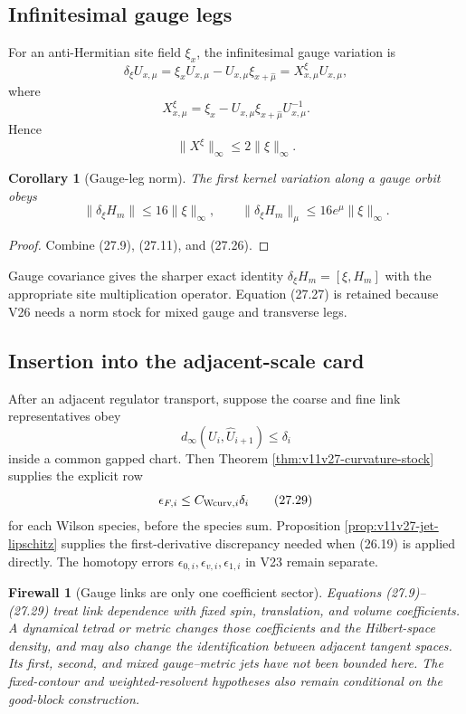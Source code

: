 \documentclass[11pt]{article}
\newtheorem{corollary}[theorem]{Corollary}
\newtheorem{firewall}[theorem]{Firewall}
\begin{document}
\subsection{Infinitesimal gauge legs}

For an anti-Hermitian site field \(\xi_x\), the infinitesimal gauge
variation is
\[
 \delta_\xi U_{x,\mu}
 =
 \xi_xU_{x,\mu}-U_{x,\mu}\xi_{x+\widehat\mu}
 =
 X^\xi_{x,\mu}U_{x,\mu},
 \tag{27.24}
\]
where
\[
 X^\xi_{x,\mu}
 =
 \xi_x-U_{x,\mu}\xi_{x+\widehat\mu}U_{x,\mu}^{-1}.
 \tag{27.25}
\]
Hence
\[
 \|X^\xi\|_\infty\leq2\|\xi\|_\infty.
 \tag{27.26}
\]

\begin{corollary}[Gauge-leg norm]
\label{cor:v11v27-gauge-leg}
The first kernel variation along a gauge orbit obeys
\[
 \|\delta_\xi H_m\|\leq16\|\xi\|_\infty,
 \qquad
 \|\delta_\xi H_m\|_\mu\leq16e^\mu\|\xi\|_\infty.
 \tag{27.27}
\]
\end{corollary}

\begin{proof}
Combine (27.9), (27.11), and (27.26).
\end{proof}

Gauge covariance gives the sharper exact identity
\(\delta_\xi H_m=[\xi,H_m]\) with the appropriate site multiplication
operator.  Equation (27.27) is retained because V26 needs a norm stock
for mixed gauge and transverse legs.

\subsection{Insertion into the adjacent-scale card}

After an adjacent regulator transport, suppose the coarse and fine link
representatives obey
\[
 d_\infty(U_i,\widehat U_{i+1})\leq\delta_i
 \tag{27.28}
\]
inside a common gapped chart.  Then Theorem
\ref{thm:v11v27-curvature-stock} supplies the explicit row
\[
 \epsilon_{F,i}\leq C_{{\rm Wcurv},i}\delta_i
 \tag{27.29}
\]
for each Wilson species, before the species sum.  Proposition
\ref{prop:v11v27-jet-lipschitz} supplies the first-derivative discrepancy
needed when (26.19) is applied directly.  The homotopy errors
\(\epsilon_{0,i},\epsilon_{v,i},\epsilon_{1,i}\) in V23 remain separate.

\begin{firewall}[Gauge links are only one coefficient sector]
\label{fw:v11v27-metric}
Equations (27.9)--(27.29) treat link dependence with fixed spin,
translation, and volume coefficients.  A dynamical tetrad or metric
changes those coefficients and the Hilbert-space density, and may also
change the identification between adjacent tangent spaces.  Its first,
second, and mixed gauge--metric jets have not been bounded here.
The fixed-contour and weighted-resolvent hypotheses also remain
conditional on the good-block construction.
\end{firewall}
\end{document}
